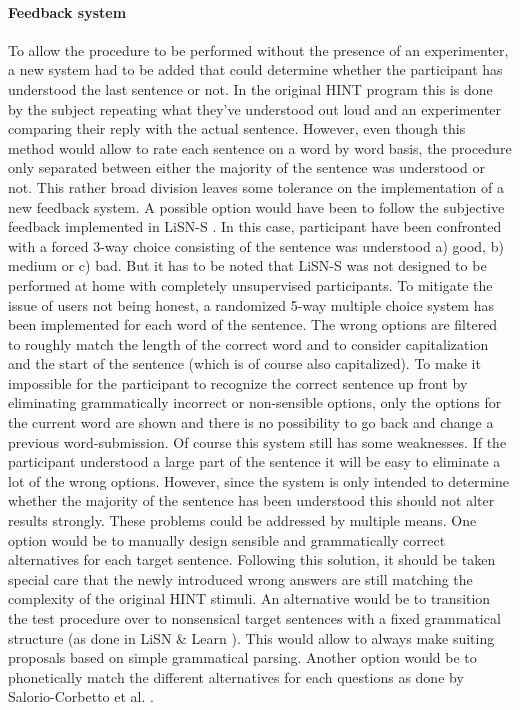 \documentclass[a4paper,11pt]{article}%
\renewcommand{\\}{\vspace*{0.5\baselineskip} \newline}
\begin{document}
\paragraph{Feedback system} To allow the procedure to be performed without the presence of an experimenter, a new system had to be added that could determine whether the participant has understood the last sentence or not. In the original \ac{HINT} program this is done by the subject repeating what they've understood out loud and an experimenter comparing their reply with the actual sentence. However, even though this method would allow to rate each sentence on a word by word basis, the procedure only separated between either the majority of the sentence was understood or not. This rather broad division leaves some tolerance on the implementation of a new feedback system. A possible option would have been to follow the subjective feedback implemented in \ac{LiSN-S} \cite{Cameron2007}. In this case, participant have been confronted with a forced 3-way choice consisting of the sentence was understood a) good, b) medium or c) bad. But it has to be noted that \ac{LiSN-S} was not designed to be performed at home with completely unsupervised participants. To mitigate the issue of users not being honest, a randomized 5-way multiple choice system has been implemented for each word of the sentence. The wrong options are filtered to roughly match the length of the correct word and to consider capitalization and the start of the sentence (which is of course also capitalized). To make it impossible for the participant to recognize the correct sentence up front by eliminating grammatically incorrect or non-sensible options, only the options for the current word are shown and there is no possibility to go back and change a previous word-submission. Of course this system still has some weaknesses. If the participant understood a large part of the sentence it will be easy to eliminate a lot of the wrong options. However, since the system is only intended to determine whether the majority of the sentence has been understood this should not alter results strongly.
\newline
\newline
These problems could be addressed by multiple means. One option would be to manually design sensible and grammatically correct alternatives for each target sentence. Following this solution, it should be taken special care that the newly introduced wrong answers are still matching the complexity of the original \ac{HINT} stimuli. An alternative would be to transition the test procedure over to nonsensical target sentences with a fixed grammatical structure (as done in \ac{LiSN} \& Learn \cite{Cameron2011}). This would allow to always make suiting proposals based on simple grammatical parsing. Another option would be to phonetically match the different alternatives for each questions as done by Salorio-Corbetto et al. \cite{salorioevaluating}.
\end{document}
